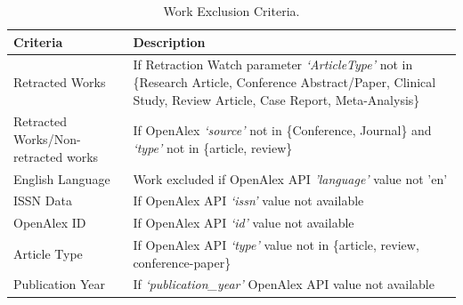 \documentclass[pdflatex,sn-mathphys-num]{sn-jnl}
\begin{document}
\begin{table}
	\caption{Work Exclusion Criteria.\label{tab_work_exclusion_criteria}}
	\small
	\begin{tabularx}{\textwidth}{>{\hspace{0pt}}p{}>{\raggedright\arraybackslash\hspace{0pt}}X}
		\toprule
		\textbf{Criteria}                                                        & \textbf{Description}                                                                                                                                                                         \\
		\midrule
		Retracted Works                                                          & If Retraction Watch parameter \textit{`ArticleType'} not in \{Research Article, Conference Abstract/Paper, Clinical Study, Review Article, Case Report, Meta-Analysis\}                      \\
		Retracted Works/Non-retracted works                                      & If OpenAlex \textit{`source'} not in \{Conference, Journal\} and \textit{`type'} not in \{article, review\}                                                                                  \\
		English Language                                                         & Work excluded if OpenAlex API \textit{'language'} value not 'en'                                                                                                                             \\
		ISSN Data                                                                & If OpenAlex API \textit{`issn'} value not available                                                                                                                                          \\
		OpenAlex ID                                                              & If OpenAlex API \textit{`id'} value not available                                                                                                                                            \\
		Article Type                                                             & If OpenAlex API \textit{`type'} value not in \{article, review, conference-paper\}                                                                                                           \\
		Publication Year                                                         & If \textit{`publication\_year'} OpenAlex API value not available                                                                                                                             \\

\end{tabularx}
\end{table}
\end{document}
